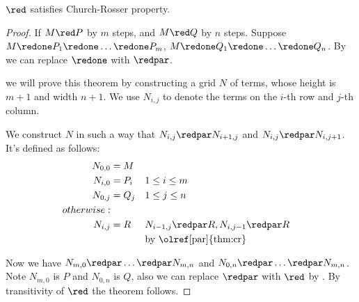 \documentclass[../../../include/open-logic-section]{subfiles}
\begin{document}
\begin{thm}
  $\red$ satisfies Church-Rosser property.
\end{thm}
\begin{proof}
  If $M \red P$ by $m$ steps, and $M \red Q$ by $n$ steps.  Suppose $M \redone P_1 \redone \ldots \redone P_m$, $M \redone Q_1
  \redone \ldots \redone Q_n$. By  we can replace
  $\redone$ with $\redpar$.
  
  we will prove this theorem by constructing a grid $N$ of terms, whose height is $m + 1$ and width $n + 1$. We use $N_{i,j}$ to denote the terms
  on the $i$-th row and $j$-th column.
  
  We construct $N$ in such a way that $N_{i,j} \redpar N_{i+1,j}$ and
  $N_{i,j} \redpar N_{i,j+1}$. It's defined as follows:
  \begin{align*}
    N_{0,0} &= M \\
    N_{i,0} &= P_i && 1 \le i \le m \\
    N_{0,j} &= Q_j && 1 \le j \le n \\
    otherwise: & \\
    N_{i,j} &= R && N_{i-1,j} \redpar R, N_{i,j-1} \redpar R \\
    & && \text{by \olref[par]{thm:cr}}
  \end{align*}

  Now we have $N_{m,0} \redpar \ldots \redpar N_{m,n}$ and $N_{0,n}
  \redpar \ldots \redpar N_{m,n}$. Note $N_{m,0}$ is $P$ and $N_{0,n}$
  is $Q$, also we can replace $\redpar$ with $\red$ by
  . By transitivity of $\red$ the theorem follows.
\end{proof}
\end{document}

